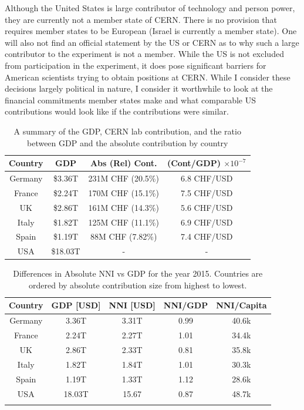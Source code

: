 Although the United States is large contributor of technology
and person power, they are currently not a member state of CERN.
There is no provision that requires member states to be European
 (Israel is currently a member state). One will also not find
an official statement by the US or CERN as to why such a large contributor to the experiment
is not a member. While the US is not excluded from participation 
in the experiment, it does pose significant barriers for American scientists 
trying to obtain positions at CERN.  While I consider these decisions 
largely political in nature, I consider it worthwhile
to look  at the financial commitments member states make
 and what comparable US contributions would look like if the contributions were similar.
\begin{center}
\begin{table}[]
\begin{center}
\caption{A summary of the GDP, CERN lab contribution, and the ratio between GDP and the absolute contribution 
by country}
\begin{tabular}{cccc}
\textbf{Country} & GDP & Abs (Rel) Cont. & (Cont/GDP) $\times 10^{-7}$ \\
\hline
Germany & \$3.36T  & 231M CHF (20.5\%) & 6.8 CHF/USD  \\
France  & \$2.24T  & 170M CHF (15.1\%) & 7.5 CHF/USD\\
UK      & \$2.86T  & 161M CHF (14.3\%) & 5.6 CHF/USD\\
Italy   & \$1.82T  & 125M CHF (11.1\%) & 6.9 CHF/USD\\
Spain   & \$1.19T  & 88M  CHF (7.82\%) & 7.4 CHF/USD\\
\hline
USA     & \$18.03T & -             & -     
\end{tabular}
\end{center}
\label{tab:gdpcontrib}
\end{table}
\end{center}
\begin{center}
\begin{table}[]
\begin{center}
\caption{Differences in Absolute NNI vs GDP for the year 2015. Countries are ordered by absolute 
contribution size from highest to lowest. }
\begin{tabular}{ccccc}
\textbf{Country} & \textbf{GDP [USD]} & \textbf{NNI [USD]} &  \textbf{NNI/GDP} & \textbf{NNI/Capita}    \\
\hline
Germany & 3.36T & 3.31T & 0.99 & 40.6k\\
France  & 2.24T & 2.27T & 1.01 & 34.4k\\
UK      & 2.86T & 2.33T & 0.81 & 35.8k\\
Italy   & 1.82T & 1.84T & 1.01 & 30.3k\\
Spain   & 1.19T & 1.33T & 1.12 & 28.6k\\
\hline
USA     & 18.03T & 15.67 & 0.87 & 48.7k\\
\label{tab:nnicontrib}
\end{tabular}
\end{center}
\end{table}
\end{center}
